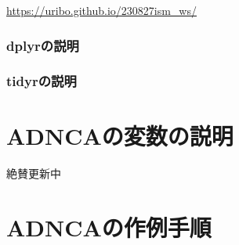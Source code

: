\documentclass[
  letterpaper,
  DIV=11,
  numbers=noendperiod]{scrreprt}
\begin{document}
\url{https://uribo.github.io/230827ism_ws/}

\hypertarget{dplyrux306eux8aacux660e}{%
\subsection{dplyrの説明}\label{dplyrux306eux8aacux660e}}

\hypertarget{tidyrux306eux8aacux660e}{%
\subsection{tidyrの説明}\label{tidyrux306eux8aacux660e}}


\hypertarget{adncaux306eux5909ux6570ux306eux8aacux660e}{%
\chapter{ADNCAの変数の説明}\label{adncaux306eux5909ux6570ux306eux8aacux660e}}

絶賛更新中


\hypertarget{adncaux306eux4f5cux4f8bux624bux9806}{%
\chapter{ADNCAの作例手順}\label{adncaux306eux4f5cux4f8bux624bux9806}}
\end{document}
